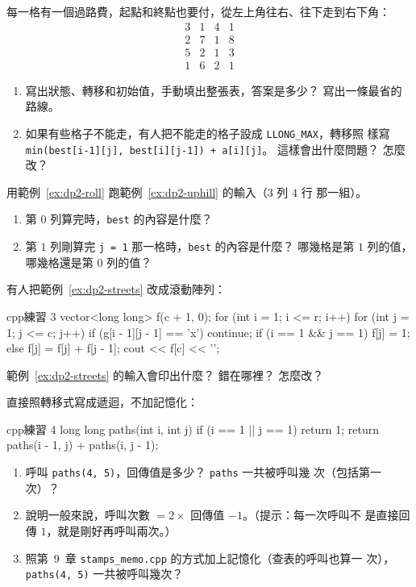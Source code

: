 \begin{drills}[label=drills:dp2]
\item 每一格有一個過路費，起點和終點也要付，從左上角往右、往下走到右下角：
\[
\begin{matrix}
3 & 1 & 4 & 1 \\
2 & 7 & 1 & 8 \\
5 & 2 & 1 & 3 \\
1 & 6 & 2 & 1
\end{matrix}
\]
\begin{enumerate}
\item 寫出狀態、轉移和初始值，手動填出整張表，答案是多少？ 寫出一條最省的
路線。
\item 如果有些格子不能走，有人把不能走的格子設成 \texttt{LLONG\_MAX}，轉移照
樣寫 \texttt{min(best[i-1][j], best[i][j-1]) + a[i][j]}。 這樣會出什麼問題？
怎麼改？
\end{enumerate}

\item 用範例~\ref{ex:dp2-roll} 跑範例~\ref{ex:dp2-uphill} 的輸入（$3$ 列 $4$ 行
那一組）。
\begin{enumerate}
\item 第 $0$ 列算完時，\texttt{best} 的內容是什麼？
\item 第 $1$ 列剛算完 \texttt{j = 1} 那一格時，\texttt{best} 的內容是什麼？
哪幾格是第 $1$ 列的值，哪幾格還是第 $0$ 列的值？
\end{enumerate}

\item 有人把範例~\ref{ex:dp2-streets} 改成滾動陣列：
\begin{code}{cpp}{練習 3}
vector<long long> f(c + 1, 0);
for (int i = 1; i <= r; i++) {
    for (int j = 1; j <= c; j++) {
        if (g[i - 1][j - 1] == 'x') {
            continue;
        }
        if (i == 1 && j == 1) {
            f[j] = 1;
        } else {
            f[j] = f[j] + f[j - 1];
        }
    }
}
cout << f[c] << '\n';
\end{code}
範例~\ref{ex:dp2-streets} 的輸入會印出什麼？ 錯在哪裡？ 怎麼改？

\item 直接照轉移式寫成遞迴，不加記憶化：
\begin{code}{cpp}{練習 4}
long long paths(int i, int j) {
    if (i == 1 || j == 1) {
        return 1;
    }
    return paths(i - 1, j) + paths(i, j - 1);
}
\end{code}
\begin{enumerate}
\item 呼叫 \texttt{paths(4, 5)}，回傳值是多少？ \texttt{paths} 一共被呼叫幾
次（包括第一次）？
\item 說明一般來說，呼叫次數 $= 2 \times$ 回傳值 $- 1$。（提示：每一次呼叫不
是直接回傳 $1$，就是剛好再呼叫兩次。）
\item 照第~9~章 \texttt{stamps\_memo.cpp} 的方式加上記憶化（查表的呼叫也算一
次），\texttt{paths(4, 5)} 一共被呼叫幾次？
\end{enumerate}


\end{drills}
